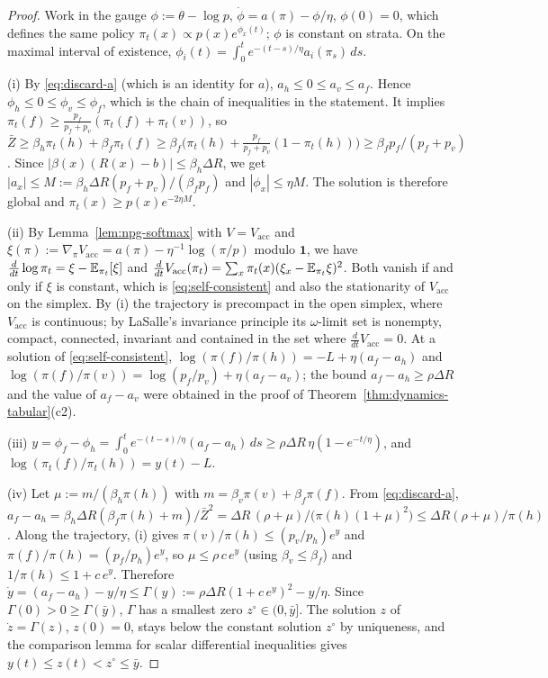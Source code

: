 \begin{proof}
Work in the gauge $\phi:=\theta-\log p$, $\dot\phi=a(\pi)-\phi/\eta$,
$\phi(0)=0$, which defines the same policy
$\pi_t(x)\propto p(x)e^{\phi_x(t)}$; $\phi$ is constant on strata. On the
maximal interval of existence,
$\phi_i(t)=\int_0^te^{-(t-s)/\eta}a_i(\pi_s)\,ds$.

(i) By \eqref{eq:discard-a} (which is an identity for $a$),
$a_h\le0\le a_v\le a_f$. Hence $\phi_h\le0\le\phi_v\le\phi_f$, which is the
chain of inequalities in the statement. It implies
$\pi_t(f)\ge\frac{p_f}{p_f+p_v}(\pi_t(f)+\pi_t(v))$, so
$\bar Z\ge\beta_h\pi_t(h)+\beta_f\pi_t(f)\ge\beta_f\bigl(\pi_t(h)+\tfrac{p_f}{p_f+p_v}(1-\pi_t(h))\bigr)\ge\beta_fp_f/(p_f+p_v)$.
Since $|\beta(x)(R(x)-b)|\le\beta_h\Delta R$, we get
$|a_x|\le M:=\beta_h\Delta R(p_f+p_v)/(\beta_fp_f)$ and $|\phi_x|\le\eta M$.
The solution is therefore global and
$\pi_t(x)\ge p(x)e^{-2\eta M}$.

(ii) By Lemma~\ref{lem:npg-softmax} with $V=V_{\mathrm{acc}}$ and
$\xi(\pi):=\nabla_\pi V_{\mathrm{acc}}=a(\pi)-\eta^{-1}\log(\pi/p)$ modulo
$\mathbf 1$, we have $\frac{d}{dt}\log\pi_t=\xi-\mathbb{E}_{\pi_t}[\xi]$ and
$\frac{d}{dt}V_{\mathrm{acc}}(\pi_t)=\sum_x\pi_t(x)(\xi_x-\mathbb{E}_{\pi_t}\xi)^2$.
Both vanish if and only if $\xi$ is constant, which is
\eqref{eq:self-consistent} and also the stationarity of
$V_{\mathrm{acc}}$ on the simplex. By (i) the trajectory is precompact in
the open simplex, where $V_{\mathrm{acc}}$ is continuous; by LaSalle's
invariance principle \cite{lasalle1976stability} its $\omega$-limit set is
nonempty, compact, connected, invariant and contained in the set where
$\frac{d}{dt}V_{\mathrm{acc}}=0$. At a solution of
\eqref{eq:self-consistent},
$\log(\pi(f)/\pi(h))=-L+\eta(a_f-a_h)$ and
$\log(\pi(f)/\pi(v))=\log(p_f/p_v)+\eta(a_f-a_v)$; the bound
$a_f-a_h\ge\rho\Delta R$ and the value of $a_f-a_v$ were obtained in the
proof of Theorem~\ref{thm:dynamics-tabular}(c2).

(iii) $y=\phi_f-\phi_h=\int_0^te^{-(t-s)/\eta}(a_f-a_h)\,ds\ge\rho\Delta R\,\eta(1-e^{-t/\eta})$,
and $\log(\pi_t(f)/\pi_t(h))=y(t)-L$.

(iv) Let $\mu:=m/(\beta_h\pi(h))$ with $m=\beta_v\pi(v)+\beta_f\pi(f)$.
From \eqref{eq:discard-a},
$a_f-a_h=\beta_h\Delta R(\beta_f\pi(h)+m)/\bar Z^2
=\Delta R\,(\rho+\mu)/\bigl(\pi(h)(1+\mu)^2\bigr)\le\Delta R(\rho+\mu)/\pi(h)$.
Along the trajectory, (i) gives
$\pi(v)/\pi(h)\le(p_v/p_h)e^{y}$ and $\pi(f)/\pi(h)=(p_f/p_h)e^{y}$, so
$\mu\le\rho\,c\,e^{y}$ (using $\beta_v\le\beta_f$) and
$1/\pi(h)\le1+c\,e^{y}$. Therefore
$\dot y=(a_f-a_h)-y/\eta\le\Gamma(y):=\rho\Delta R(1+c\,e^{y})^2-y/\eta$.
Since $\Gamma(0)>0\ge\Gamma(\bar y)$, $\Gamma$ has a smallest zero
$z^\circ\in(0,\bar y]$. The solution $z$ of $\dot z=\Gamma(z)$, $z(0)=0$,
stays below the constant solution $z^\circ$ by uniqueness, and the
comparison lemma for scalar differential inequalities gives
$y(t)\le z(t)<z^\circ\le\bar y$.


\end{proof}
